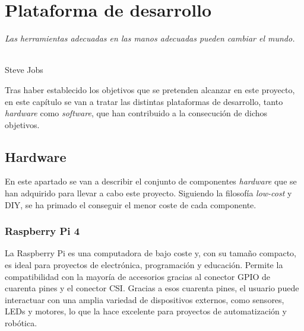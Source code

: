 \chapter{Plataforma de desarrollo}
\label{cap:capitulo4}

\begin{flushright}
\begin{minipage}[]{10cm}
\emph{Las herramientas adecuadas en las manos adecuadas pueden cambiar el mundo.}\\
\end{minipage}\\

Steve Jobs\\
\end{flushright}

\vspace{1cm}

Tras haber establecido los objetivos que se pretenden alcanzar en este proyecto, en este capítulo se van a tratar las distintas plataformas de desarrollo, tanto \textit{hardware} como \textit{software}, que han contribuido a la consecución de dichos objetivos.

\section{Hardware}
\label{sec:hardware}

En este apartado se van a describir el conjunto de componentes \textit{hardware} que se han adquirido para llevar a cabo este proyecto. Siguiendo la filosofía \textit{low-cost} y \ac{DIY}, se ha primado el conseguir el menor coste de cada componente.

\subsection{Raspberry Pi 4}
\label{subsec:raspberry}

La Raspberry Pi es una computadora de bajo coste y, con su tamaño compacto, es ideal para proyectos de electrónica, programación y educación. Permite la compatibilidad con la mayoría de accesorios gracias al conector GPIO de cuarenta pines y el conector \ac{CSI}. Gracias a esos cuarenta pines, el usuario puede interactuar con una amplia variedad de dispositivos externos, como sensores, LEDs y motores, lo que la hace excelente para proyectos de automatización y robótica. 


